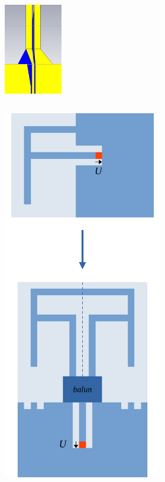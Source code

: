 \documentclass[aspectratio=43]{beamer}
\begin{document}
\begin{frame}
\begin{columns}
				\includegraphics[width=0.3\textwidth]{balun_3.png}
		\end{columns}
\end{frame}
\begin{frame}
		\begin{columns}
		\centering
				\centering
				\includegraphics[width=0.6\textwidth]{koncepcio.pdf}\\[3ex]

\end{columns}
\end{frame}
\end{document}
